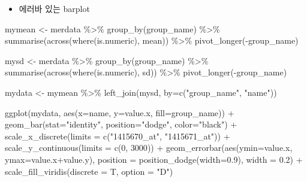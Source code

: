 \documentclass[
]{book}
\newenvironment{Shaded}{\begin{snugshade}}{\end{snugshade}}
\newcommand{\AttributeTok}[1]{\textcolor[rgb]{0.77,0.63,0.00}{#1}}
\newcommand{\DecValTok}[1]{\textcolor[rgb]{0.00,0.00,0.81}{#1}}
\newcommand{\FloatTok}[1]{\textcolor[rgb]{0.00,0.00,0.81}{#1}}
\newcommand{\FunctionTok}[1]{\textcolor[rgb]{0.00,0.00,0.00}{#1}}
\newcommand{\NormalTok}[1]{#1}
\newcommand{\OtherTok}[1]{\textcolor[rgb]{0.56,0.35,0.01}{#1}}
\newcommand{\SpecialCharTok}[1]{\textcolor[rgb]{0.00,0.00,0.00}{#1}}
\newcommand{\StringTok}[1]{\textcolor[rgb]{0.31,0.60,0.02}{#1}}
\providecommand{\tightlist}{%
  \setlength{\itemsep}{0pt}\setlength{\parskip}{0pt}}
\begin{document}
\begin{itemize}
\tightlist
\item
  에러바 있는 barplot
\end{itemize}

\begin{Shaded}
\begin{Highlighting}[]
\NormalTok{mymean }\OtherTok{\textless{}{-}}\NormalTok{ merdata }\SpecialCharTok{\%\textgreater{}\%}
 \FunctionTok{group\_by}\NormalTok{(group\_name) }\SpecialCharTok{\%\textgreater{}\%}
 \FunctionTok{summarise}\NormalTok{(}\FunctionTok{across}\NormalTok{(}\FunctionTok{where}\NormalTok{(is.numeric), mean)) }\SpecialCharTok{\%\textgreater{}\%}
 \FunctionTok{pivot\_longer}\NormalTok{(}\SpecialCharTok{{-}}\NormalTok{group\_name)}

\NormalTok{mysd }\OtherTok{\textless{}{-}}\NormalTok{ merdata }\SpecialCharTok{\%\textgreater{}\%}
 \FunctionTok{group\_by}\NormalTok{(group\_name) }\SpecialCharTok{\%\textgreater{}\%}
 \FunctionTok{summarise}\NormalTok{(}\FunctionTok{across}\NormalTok{(}\FunctionTok{where}\NormalTok{(is.numeric), sd)) }\SpecialCharTok{\%\textgreater{}\%}
 \FunctionTok{pivot\_longer}\NormalTok{(}\SpecialCharTok{{-}}\NormalTok{group\_name)}

\NormalTok{mydata }\OtherTok{\textless{}{-}}\NormalTok{ mymean }\SpecialCharTok{\%\textgreater{}\%}
 \FunctionTok{left\_join}\NormalTok{(mysd, }\AttributeTok{by=}\FunctionTok{c}\NormalTok{(}\StringTok{"group\_name"}\NormalTok{, }\StringTok{"name"}\NormalTok{))}


\FunctionTok{ggplot}\NormalTok{(mydata, }\FunctionTok{aes}\NormalTok{(}\AttributeTok{x=}\NormalTok{name, }\AttributeTok{y=}\NormalTok{value.x, }\AttributeTok{fill=}\NormalTok{group\_name)) }\SpecialCharTok{+}
  \FunctionTok{geom\_bar}\NormalTok{(}\AttributeTok{stat=}\StringTok{"identity"}\NormalTok{, }\AttributeTok{position=}\StringTok{"dodge"}\NormalTok{, }\AttributeTok{color=}\StringTok{"black"}\NormalTok{) }\SpecialCharTok{+}
  \FunctionTok{scale\_x\_discrete}\NormalTok{(}\AttributeTok{limits =} \FunctionTok{c}\NormalTok{(}\StringTok{"1415670\_at"}\NormalTok{, }\StringTok{"1415671\_at"}\NormalTok{)) }\SpecialCharTok{+}
  \FunctionTok{scale\_y\_continuous}\NormalTok{(}\AttributeTok{limits =} \FunctionTok{c}\NormalTok{(}\DecValTok{0}\NormalTok{, }\DecValTok{3000}\NormalTok{)) }\SpecialCharTok{+}
  \FunctionTok{geom\_errorbar}\NormalTok{(}\FunctionTok{aes}\NormalTok{(}\AttributeTok{ymin=}\NormalTok{value.x, }\AttributeTok{ymax=}\NormalTok{value.x}\SpecialCharTok{+}\NormalTok{value.y),}
                \AttributeTok{position =} \FunctionTok{position\_dodge}\NormalTok{(}\AttributeTok{width=}\FloatTok{0.9}\NormalTok{), }
                \AttributeTok{width =} \FloatTok{0.2}\NormalTok{) }\SpecialCharTok{+}
  \FunctionTok{scale\_fill\_viridis}\NormalTok{(}\AttributeTok{discrete =}\NormalTok{ T, }\AttributeTok{option =} \StringTok{"D"}\NormalTok{)}
  
\end{Highlighting}
\end{Shaded}
\end{document}
